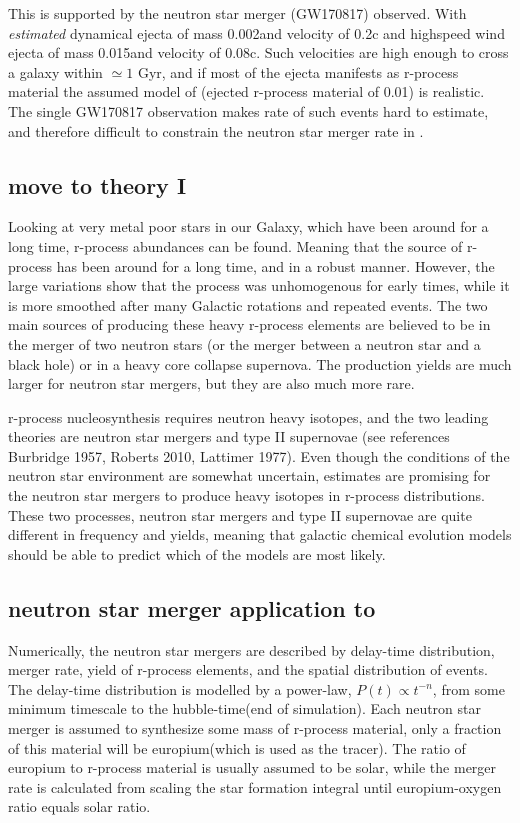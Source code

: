 This is supported by the neutron star merger (GW170817) observed. With \textit{estimated} dynamical ejecta of mass 0.002\msol and velocity of 0.2c and highspeed wind ejecta of mass 0.015\msol and velocity of 0.08c. Such velocities are high enough to cross a galaxy within $\simeq 1$ Gyr, and if most of the ejecta manifests as r-process material the assumed model of  (ejected r-process material of 0.01\msol) is realistic. The single GW170817 observation makes rate of such events hard to estimate, and therefore difficult to constrain the neutron star merger rate in \eris.

\subsection{move to theory I}
Looking at very metal poor stars in our Galaxy, which have been around for a long time, r-process abundances can be found. Meaning that the source of r-process has been around for a long time, and in a robust manner. However, the large variations show that the process was unhomogenous for early times, while it is more smoothed after many Galactic rotations and repeated events.
The two main sources of producing these heavy r-process elements are believed to be in the merger of two neutron stars (or the merger between a neutron star and a black hole) or in a heavy core collapse supernova. The production yields are much larger for neutron star mergers, but they are also much more rare.

r-process nucleosynthesis requires neutron heavy isotopes, and the two leading theories are neutron star mergers and type II supernovae (see references Burbridge 1957, Roberts 2010, Lattimer 1977). Even though the conditions of the neutron star environment are somewhat uncertain, estimates are promising for the neutron star mergers to produce heavy isotopes in r-process distributions.
These two processes, neutron star mergers and type II supernovae are quite different in frequency and yields, meaning that galactic chemical evolution models should be able to predict which of the models are most likely.

\subsection{neutron star merger application to \eris}
Numerically, the neutron star mergers are described by delay-time distribution, merger rate, yield of r-process elements, and the spatial distribution of events.
The delay-time distribution is modelled by a power-law, $P(t) \propto t^{-n}$, from some minimum timescale to the hubble-time(end of simulation).
Each neutron star merger is assumed to synthesize some mass of r-process material, only a fraction of this material will be europium(which is used as the tracer).
The ratio of europium to r-process material is usually assumed to be solar, while the merger rate is calculated from scaling the star formation integral until europium-oxygen ratio equals solar ratio.

